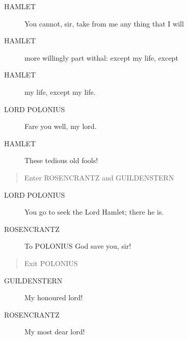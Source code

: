 \documentclass{article}
\begin{document}
\begin{description}
            
\item[HAMLET] You cannot, sir, take from me any thing that I will
\item[HAMLET] more willingly part withal: except my life, except
\item[HAMLET] my life, except my life.
\end{description}
          
\begin{description}
            
\item[LORD POLONIUS] Fare you well, my lord.
\end{description}
          
\begin{description}
            
\item[HAMLET] These tedious old fools!
\end{description}
          
\begin{quote}
Enter ROSENCRANTZ and GUILDENSTERN
\end{quote}
          
\begin{description}
            
\item[LORD POLONIUS] You go to seek the Lord Hamlet; there he is.
\end{description}
          
\begin{description}
            
\item[ROSENCRANTZ] 
               To POLONIUS  God save you, sir!
\end{description}
          
\begin{quote}
Exit POLONIUS
\end{quote}
          
\begin{description}
            
\item[GUILDENSTERN] My honoured lord!
\end{description}
          
\begin{description}
            
\item[ROSENCRANTZ] My most dear lord!
\end{description}
          
\end{document}
